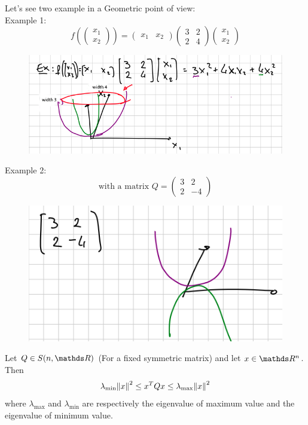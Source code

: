 \documentclass[computationalMathematics.tex]{subfiles}
\begin{document}
Let's see two example in a Geometric point of view:\\
Example 1:
$$ f(\begin{pmatrix} x_1\\ x_2 \end{pmatrix}) = \begin{pmatrix} x_1 & x_2 \end{pmatrix}
\begin{pmatrix} 3 & 2 \\ 2 & 4 \end{pmatrix}\begin{pmatrix} x_1\\ x_2 \end{pmatrix}
$$
\begin{figure}[H]
    \centering
    \includegraphics[scale = 0.45]{pics/26sett/quadratic_form_1.png}
\end{figure}

Example 2: 
$$\text{with a matrix } Q = \begin{pmatrix} 3 & 2 \\ 2 & -4 \end{pmatrix}$$
\begin{figure}[H]
    \centering
    \includegraphics[scale = 0.45]{pics/26sett/quadratic_form_2.png}
\end{figure}

\newpage
\begin{proposition}
  Let $Q \in S(n, \R)$ (For a fixed symmetric matrix) and let $x \in \R^n$. Then 
  $$\lambda_{\text{min}} {\left\lVert x\right\rVert}^2 \le {x}^{T}Qx \le \lambda_{\text{max}} {\left\lVert x\right\rVert}^2$$
  where $\lambda_{\text{max}}$ and $\lambda_{\text{min}}$ are respectively the eigenvalue of maximum value and the eigenvalue of minimum value.
\end{proposition}
\end{document}

